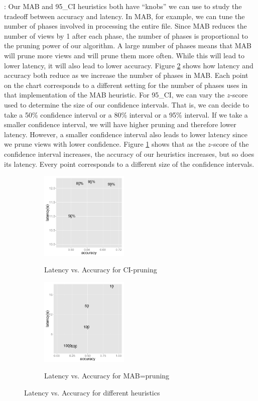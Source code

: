 :
Our MAB and 95\_CI heuristics both have ``knobs'' we can use to study the
tradeoff between accuracy and latency.
In MAB, for example, we can tune the number of phases involved in
processing the entire file. 
Since MAB reduces the number of views by 1 after each phase, the number of
phases is proportional to the pruning power of our algorithm.
A large number of phases means that MAB will prune more views and will prune
them more often.
While this will lead to lower latency, it will also lead to lower accuracy.
Figure \ref{fig:latency_vs_accuracy_mab} shows how latency and accuracy both
reduce as we increase the number of phases in MAB.
Each point on the chart corresponds to a different setting for the number of
phases uses in that implementation of the MAB heuristic.
For 95\_CI, we can vary the $z$-score used
to determine the size of our confidence intervals.
That is, we can decide to take a 50\% confidence interval or a 80\% interval or
a 95\% interval.
If we take a smaller confidence interval, we will have higher pruning and
therefore lower latency.
However, a smaller confidence interval also leads to lower latency since we
prune views with lower confidence.
Figure \ref{fig:latency_vs_accuracy_ci} shows that as the $z$-score of the
confidence interval increases, the accuracy of our heuristics increases, but so
does its latency.
Every point corresponds to a different size of the confidence intervals.

\begin{figure}[h] 
\centering
\begin{subfigure}{0.49\linewidth}
\centering
{\includegraphics[width=4.2cm] {Images/latency_vs_accuracy_ci.pdf}}
\caption{Latency vs. Accuracy for CI-pruning}
\label{fig:latency_vs_accuracy_ci}
\end{subfigure}
\begin{subfigure}{0.49\linewidth}
\centering
{\includegraphics[width=4.2cm] {Images/latency_vs_accuracy_mab.pdf}}
\caption{Latency vs. Accuracy for MAB=pruning}
\label{fig:latency_vs_accuracy_mab}
\end{subfigure}
\label{fig:accuracy}
\caption{Latency vs. Accuracy for different heuristics}
\end{figure}

